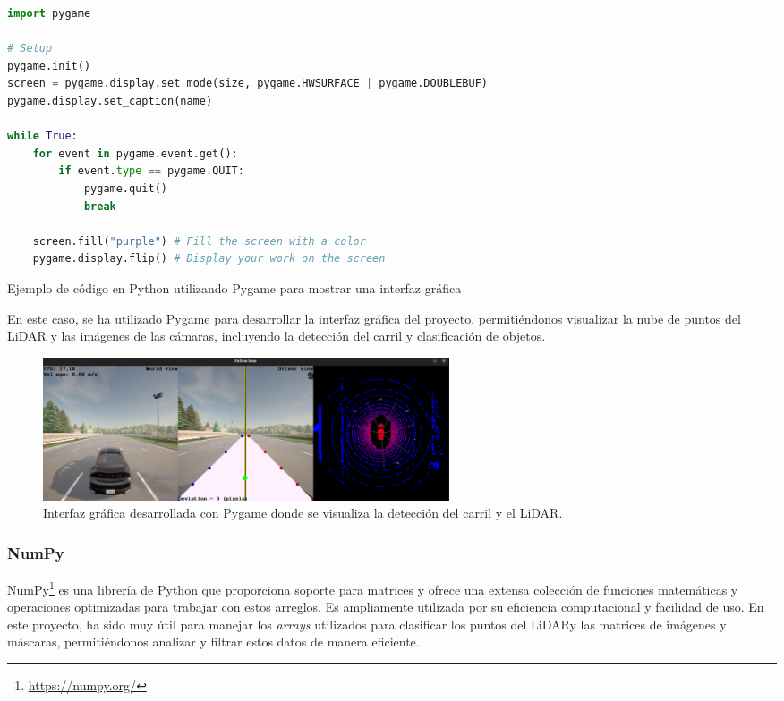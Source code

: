 \begin{code}[h]
\begin{lstlisting}[language=Python]
import pygame

# Setup
pygame.init()
screen = pygame.display.set_mode(size, pygame.HWSURFACE | pygame.DOUBLEBUF)
pygame.display.set_caption(name)

while True:
	for event in pygame.event.get():
		if event.type == pygame.QUIT:
			pygame.quit()
			break

	screen.fill("purple") # Fill the screen with a color
	pygame.display.flip() # Display your work on the screen
\end{lstlisting}
\caption[Ejemplo de código en Python utilizando Pygame]{Ejemplo de código en Python utilizando Pygame para mostrar una interfaz gráfica}
\label{cod:pygame}
\end{code}

En este caso, se ha utilizado Pygame para desarrollar la interfaz gráfica del proyecto, permitiéndonos visualizar la nube de puntos del \ac{LiDAR} y las imágenes de las cámaras, incluyendo la detección del carril y clasificación de objetos.

\begin{figure}[ht]
\begin{center}
\includegraphics[width=12cm]{figs/Plataformas_Desarollo/pygame.png}
\end{center}
\caption{Interfaz gráfica desarrollada con Pygame donde se visualiza la detección del carril y el \ac{LiDAR}.}
\label{foto_pygame}
\end{figure}

\subsubsection{NumPy}
\label{sec:numpy}

NumPy\footnote{\url{https://numpy.org/}} es una librería de Python que proporciona soporte para matrices y ofrece una extensa colección de funciones matemáticas y operaciones optimizadas para trabajar con estos arreglos. Es ampliamente utilizada por su eficiencia computacional y facilidad de uso. En este proyecto, ha sido muy útil para manejar los \textit{arrays} utilizados para clasificar los puntos del \ac{LiDAR}y las matrices de imágenes y máscaras, permitiéndonos analizar y filtrar estos datos de manera eficiente.

